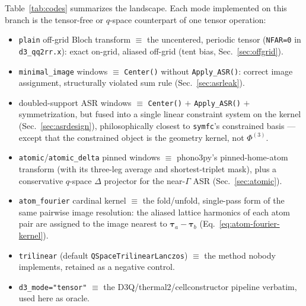 \documentclass[11pt,a4paper]{article}
\begin{document}
Table~\ref{tab:codes} summarizes the landscape.  Each mode implemented on
this branch is the tensor-free or $q$-space counterpart of one tensor
operation:
\begin{itemize}
\item \texttt{plain} off-grid Bloch transform $\equiv$ the uncentered,
  periodic tensor (\texttt{NFAR=0} in \texttt{d3\_qq2rr.x}): exact
  on-grid, aliased off-grid (tent bias, Sec.~\ref{sec:offgrid}).
\item \texttt{minimal\_image} windows $\equiv$ \texttt{Center()} without
  \texttt{Apply\_ASR()}: correct image assignment, structurally violated
  sum rule (Sec.~\ref{sec:asrleak}).
\item doubled-support ASR windows $\equiv$ \texttt{Center()} $+$
  \texttt{Apply\_ASR()} $+$ symmetrization, but fused into a single
  linear constraint system on the kernel (Sec.~\ref{sec:asrdesign}),
  philosophically closest to \texttt{symfc}'s constrained basis ---
  except that the constrained object is the geometry kernel, not
  $\Phi^{(3)}$.
\item \texttt{atomic}/\texttt{atomic\_delta} pinned windows $\equiv$
  phono3py's pinned-home-atom transform (with its three-leg average and
  shortest-triplet mask), plus a conservative $q$-space $\Delta$
  projector for the near-$\Gamma$ ASR (Sec.~\ref{sec:atomic}).
\item \texttt{atom\_fourier} cardinal kernel $\equiv$ the fold/unfold,
  single-pass form of the same pairwise image resolution: the aliased
  lattice harmonics of each atom pair are assigned to the image nearest
  to $\boldsymbol\tau_a-\boldsymbol\tau_b$
  (Eq.~\eqref{eq:atom-fourier-kernel}).
\item \texttt{trilinear} (default \texttt{QSpaceTrilinearLanczos})
  $\equiv$ the method nobody implements, retained as a negative control.
\item \texttt{d3\_mode="tensor"} $\equiv$ the D3Q/thermal2/cellconstructor
  pipeline verbatim, used here as oracle.
\end{itemize}
\end{document}
